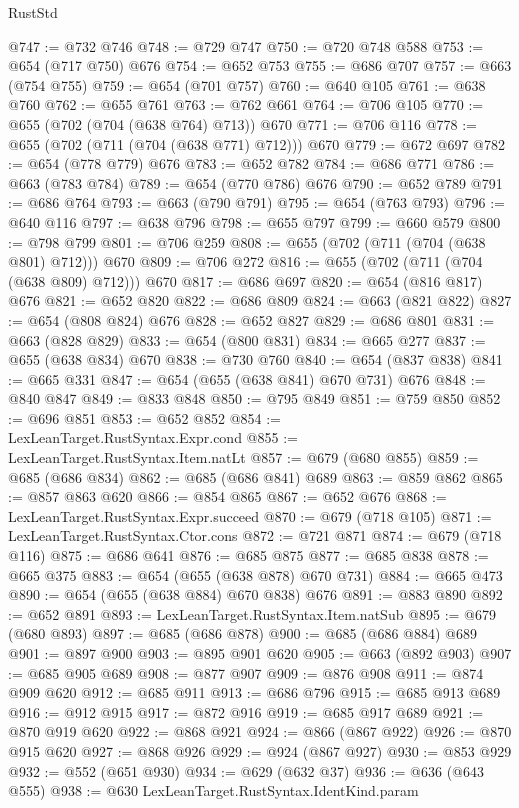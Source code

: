 \begin{lexlean}{RustStd}
\begin{coremodule}
@747 := @732 @746
@748 := @729 @747
@750 := @720 @748 @588
@753 := @654 (@717 @750) @676
@754 := @652 @753
@755 := @686 @707
@757 := @663 (@754 @755)
@759 := @654 (@701 @757)
@760 := @640 @105
@761 := @638 @760
@762 := @655 @761
@763 := @762 @661
@764 := @706 @105
@770 := @655 (@702 (@704 (@638 @764) @713)) @670
@771 := @706 @116
@778 := @655 (@702 (@711 (@704 (@638 @771) @712))) @670
@779 := @672 @697
@782 := @654 (@778 @779) @676
@783 := @652 @782
@784 := @686 @771
@786 := @663 (@783 @784)
@789 := @654 (@770 @786) @676
@790 := @652 @789
@791 := @686 @764
@793 := @663 (@790 @791)
@795 := @654 (@763 @793)
@796 := @640 @116
@797 := @638 @796
@798 := @655 @797
@799 := @660 @579
@800 := @798 @799
@801 := @706 @259
@808 := @655 (@702 (@711 (@704 (@638 @801) @712))) @670
@809 := @706 @272
@816 := @655 (@702 (@711 (@704 (@638 @809) @712))) @670
@817 := @686 @697
@820 := @654 (@816 @817) @676
@821 := @652 @820
@822 := @686 @809
@824 := @663 (@821 @822)
@827 := @654 (@808 @824) @676
@828 := @652 @827
@829 := @686 @801
@831 := @663 (@828 @829)
@833 := @654 (@800 @831)
@834 := @665 @277
@837 := @655 (@638 @834) @670
@838 := @730 @760
@840 := @654 (@837 @838)
@841 := @665 @331
@847 := @654 (@655 (@638 @841) @670 @731) @676
@848 := @840 @847
@849 := @833 @848
@850 := @795 @849
@851 := @759 @850
@852 := @696 @851
@853 := @652 @852
@854 := LexLeanTarget.RustSyntax.Expr.cond
@855 := LexLeanTarget.RustSyntax.Item.natLt
@857 := @679 (@680 @855)
@859 := @685 (@686 @834)
@862 := @685 (@686 @841) @689
@863 := @859 @862
@865 := @857 @863 @620
@866 := @854 @865
@867 := @652 @676
@868 := LexLeanTarget.RustSyntax.Expr.succeed
@870 := @679 (@718 @105)
@871 := LexLeanTarget.RustSyntax.Ctor.cons
@872 := @721 @871
@874 := @679 (@718 @116)
@875 := @686 @641
@876 := @685 @875
@877 := @685 @838
@878 := @665 @375
@883 := @654 (@655 (@638 @878) @670 @731)
@884 := @665 @473
@890 := @654 (@655 (@638 @884) @670 @838) @676
@891 := @883 @890
@892 := @652 @891
@893 := LexLeanTarget.RustSyntax.Item.natSub
@895 := @679 (@680 @893)
@897 := @685 (@686 @878)
@900 := @685 (@686 @884) @689
@901 := @897 @900
@903 := @895 @901 @620
@905 := @663 (@892 @903)
@907 := @685 @905 @689
@908 := @877 @907
@909 := @876 @908
@911 := @874 @909 @620
@912 := @685 @911
@913 := @686 @796
@915 := @685 @913 @689
@916 := @912 @915
@917 := @872 @916
@919 := @685 @917 @689
@921 := @870 @919 @620
@922 := @868 @921
@924 := @866 (@867 @922)
@926 := @870 @915 @620
@927 := @868 @926
@929 := @924 (@867 @927)
@930 := @853 @929
@932 := @552 (@651 @930)
@934 := @629 (@632 @37)
@936 := @636 (@643 @555)
@938 := @630 LexLeanTarget.RustSyntax.IdentKind.param

\end{coremodule}
\end{lexlean}
